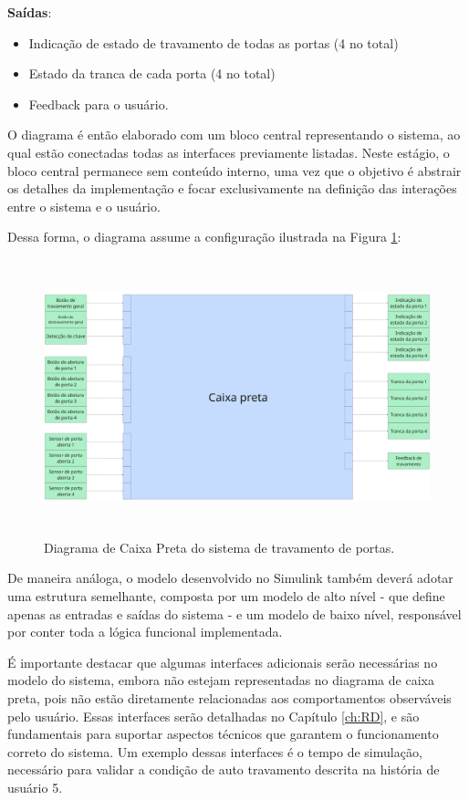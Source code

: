 \textbf{Saídas}:

\begin{itemize}
    \item Indicação de estado de travamento de todas as portas (4 no total)
    \item Estado da tranca de cada porta (4 no total)
    \item Feedback para o usuário.
\end{itemize}

O diagrama é então elaborado com um bloco central representando o sistema, ao qual estão conectadas todas as interfaces previamente listadas. Neste estágio, 
o bloco central permanece sem conteúdo interno, uma vez que o objetivo é abstrair os detalhes da implementação e focar exclusivamente na definição das 
interações entre o sistema e o usuário.

Dessa forma, o diagrama assume a configuração ilustrada na Figura \ref{fig:caixapreta}:

\begin{figure}[H]
\centering
\includegraphics[height=8cm]{figuras/diagrama_caixa_preta.png}
\caption{Diagrama de Caixa Preta do sistema de travamento de portas.}
\label{fig:caixapreta}
\end{figure}

De maneira análoga, o modelo desenvolvido no Simulink também deverá adotar uma estrutura semelhante, composta por um modelo de alto nível - que define apenas as 
entradas e saídas do sistema - e um modelo de baixo nível, responsável por conter toda a lógica funcional implementada.

É importante destacar que algumas interfaces adicionais serão necessárias no modelo do sistema, embora não estejam representadas no diagrama de caixa preta, 
pois não estão diretamente relacionadas aos comportamentos observáveis pelo usuário. Essas interfaces serão detalhadas no Capítulo \ref{ch:RD}, e são fundamentais para suportar aspectos técnicos que garantem o funcionamento correto do sistema. Um exemplo dessas interfaces é o tempo 
de simulação, necessário para validar a condição de auto travamento descrita na história de usuário 5.

